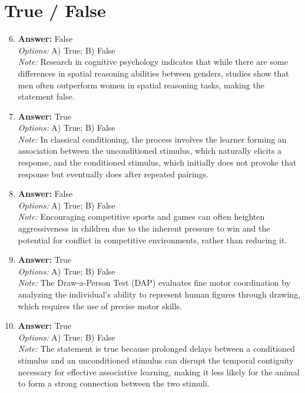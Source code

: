 \documentclass[12pt]{article}
\begin{document}
\section*{True / False}
\begin{enumerate}[label=\arabic*.]
\setcounter{enumi}{5}
\item \textbf{Answer:} False
\\ \textit{Options:} A) True; B) False
\\ \textit{Note:} Research in cognitive psychology indicates that while there are some differences in spatial reasoning abilities between genders, studies show that men often outperform women in spatial reasoning tasks, making the statement false.
\item \textbf{Answer:} True
\\ \textit{Options:} A) True; B) False
\\ \textit{Note:} In classical conditioning, the process involves the learner forming an association between the unconditioned stimulus, which naturally elicits a response, and the conditioned stimulus, which initially does not provoke that response but eventually does after repeated pairings.
\item \textbf{Answer:} False
\\ \textit{Options:} A) True; B) False
\\ \textit{Note:} Encouraging competitive sports and games can often heighten aggressiveness in children due to the inherent pressure to win and the potential for conflict in competitive environments, rather than reducing it.
\item \textbf{Answer:} True
\\ \textit{Options:} A) True; B) False
\\ \textit{Note:} The Draw-a-Person Test (DAP) evaluates fine motor coordination by analyzing the individual's ability to represent human figures through drawing, which requires the use of precise motor skills.
\item \textbf{Answer:} True
\\ \textit{Options:} A) True; B) False
\\ \textit{Note:} The statement is true because prolonged delays between a conditioned stimulus and an unconditioned stimulus can disrupt the temporal contiguity necessary for effective associative learning, making it less likely for the animal to form a strong connection between the two stimuli.
\end{enumerate}
\end{document}

